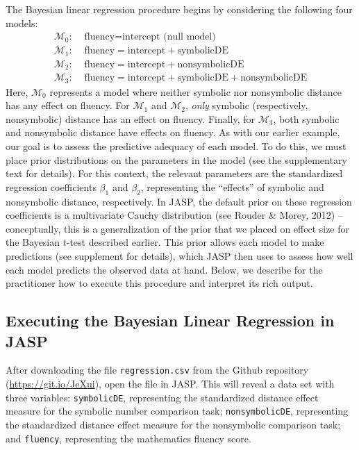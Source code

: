\documentclass[english,,doc,floatsintext]{apa6}
\begin{document}
The Bayesian linear regression procedure begins by considering the following four models:
\begin{align*}
\mathcal{M}_{0}: & \text{ fluency} = \text{intercept (null model)} \\
\mathcal{M}_{1}: & \text{ fluency} = \text{intercept} + \text{symbolicDE} \\
\mathcal{M}_{2}: & \text{ fluency} = \text{intercept} + \text{nonsymbolicDE} \\
\mathcal{M}_{3}: & \text{ fluency} = \text{intercept} + \text{symbolicDE} + \text{nonsymbolicDE}
\end{align*}
Here, \(\mathcal{M}_0\) represents a model where neither symbolic nor nonsymbolic distance has any effect on fluency. For \(\mathcal{M}_1\) and \(\mathcal{M}_2\), \emph{only} symbolic (respectively, nonsymbolic) distance has an effect on fluency. Finally, for \(\mathcal{M}_3\), both symbolic and nonsymbolic distance have effects on fluency. As with our earlier example, our goal is to assess the predictive adequacy of each model. To do this, we must place prior distributions on the parameters in the model (see the supplementary text for details). For this context, the relevant parameters are the standardized regression coefficients \(\beta_1\) and \(\beta_2\), representing the \enquote{effects} of symbolic and nonsymbolic distance, respectively. In JASP, the default prior on these regression coefficients is a multivariate Cauchy distribution (see Rouder \& Morey, 2012) -- conceptually, this is a generalization of the prior that we placed on effect size for the Bayesian \(t\)-test described earlier. This prior allows each model to make predictions (see supplement for details), which JASP then uses to assess how well each model predicts the observed data at hand. Below, we describe for the practitioner how to execute this procedure and interpret its rich output.

\hypertarget{executing-the-bayesian-linear-regression-in-jasp}{%
\subsection{Executing the Bayesian Linear Regression in JASP}\label{executing-the-bayesian-linear-regression-in-jasp}}

After downloading the file \texttt{regression.csv} from the Github repository (\url{https://git.io/JeXui}), open the file in JASP. This will reveal a data set with three variables: \texttt{symbolicDE}, representing the standardized distance effect measure for the symbolic number comparison task; \texttt{nonsymbolicDE}, representing the standardized distance effect measure for the nonsymbolic comparison task; and \texttt{fluency}, representing the mathematics fluency score.
\end{document}
